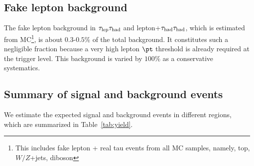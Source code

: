 \subsection{Fake lepton background}
\label{sec:fcnc_fakeLep_bkg}

The fake lepton background in $\tau_\text{lep}{}\tau_\text{had}$ and lepton+$\tau_\text{had}{}\tau_\text{had}$, which is estimated from MC\footnote{This includes fake lepton + real tau events
from all MC samples, namely, top, $W/Z$+jets, diboson}, is about $0.3$-$0.5\%$ of the total background. It constitutes
such a negligible fraction because a very high lepton $\pt$ threshold is already required at the trigger level. This
background is varied by $100\%$ as a conservative systematics.

\subsection{Summary of signal and background events}
\label{sec:background_hadhad}

We estimate the expected signal and background events in different regions, which are summarized in Table~\ref{tab:yield}. 


